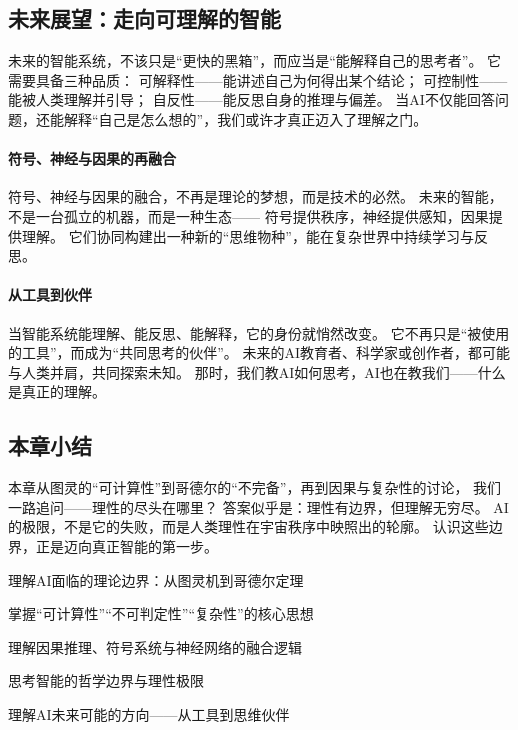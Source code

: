 \subsection{未来展望：走向可理解的智能}

未来的智能系统，不该只是“更快的黑箱”，而应当是“能解释自己的思考者”。  
它需要具备三种品质：  
可解释性——能讲述自己为何得出某个结论；  
可控制性——能被人类理解并引导；  
自反性——能反思自身的推理与偏差。  
当AI不仅能回答问题，还能解释“自己是怎么想的”，我们或许才真正迈入了理解之门。

\paragraph{符号、神经与因果的再融合}
符号、神经与因果的融合，不再是理论的梦想，而是技术的必然。  
未来的智能，不是一台孤立的机器，而是一种生态——  
符号提供秩序，神经提供感知，因果提供理解。  
它们协同构建出一种新的“思维物种”，能在复杂世界中持续学习与反思。

\paragraph{从工具到伙伴}
当智能系统能理解、能反思、能解释，它的身份就悄然改变。  
它不再只是“被使用的工具”，而成为“共同思考的伙伴”。  
未来的AI教育者、科学家或创作者，都可能与人类并肩，共同探索未知。  
那时，我们教AI如何思考，AI也在教我们——什么是真正的理解。

\subsection{本章小结}

本章从图灵的“可计算性”到哥德尔的“不完备”，再到因果与复杂性的讨论，  
我们一路追问——理性的尽头在哪里？  
答案似乎是：理性有边界，但理解无穷尽。  
AI的极限，不是它的失败，而是人类理性在宇宙秩序中映照出的轮廓。  
认识这些边界，正是迈向真正智能的第一步。

\begin{introduction}
  \item 理解AI面临的理论边界：从图灵机到哥德尔定理  
  \item 掌握“可计算性”“不可判定性”“复杂性”的核心思想  
  \item 理解因果推理、符号系统与神经网络的融合逻辑  
  \item 思考智能的哲学边界与理性极限  
  \item 理解AI未来可能的方向——从工具到思维伙伴
\end{introduction}

